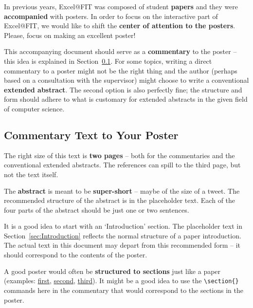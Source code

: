\documentclass{ExcelAtFIT}
\begin{document}
In previous years, Excel@FIT was composed of student \textbf{papers} and they were \textbf{accompanied} with posters.
In order to focus on the interactive part of Excel@FIT, we would like to shift the \textbf{center of attention to the posters}.
Please, focus on making an excellent poster!

This accompanying document should serve as a \textbf{commentary} to the poster -- this idea is explained in Section~\ref{sec:Commentary}.
For some topics, writing a direct commentary to a poster might not be the right thing and the author (perhaps based on a consultation with the supervisor) might choose to write a conventional \textbf{extended abstract}.  The second option is also perfectly fine; the structure and form should adhere to what is customary for extended abstracts in the given field of computer science.

\subsection{Commentary Text to Your Poster}
\label{sec:Commentary}

The right size of this text is \textbf{two pages} -- both for the commentaries and the conventional extended abstracts.  The references can spill to the third page, but not the text itself.

The \textbf{abstract} is meant to be \textbf{super-short} -- maybe of the size of a tweet.  The recommended structure of the abstract \cite{Herout-Abstract,Lebrun2011} is in the placeholder text.  Each of the four parts of the abstract should be just one or two sentences.

It is a good idea to start with an `Introduction' section.  The placeholder text in Section~\ref{sec:Introduction} reflects the normal structure of a paper introduction.  The actual text in this document may depart from this recommended form -- it should correspond to the contents of the poster.

A good poster would often be \textbf{structured to sections} just like a paper (examples: \href{https://excel.fit.vutbr.cz/submissions/2022/001/1_poster.pdf}{first}, \href{https://excel.fit.vutbr.cz/submissions/2022/002/2_poster.pdf}{second}, \href{https://excel.fit.vutbr.cz/submissions/2022/003/3_poster.pdf}{third}).  It might be a good idea to use the \verb|\section{}| commands here in the commentary that would correspond to the sections in the poster.
\end{document}
